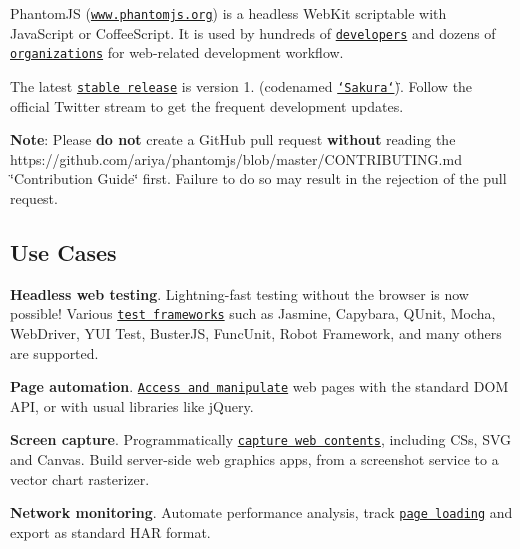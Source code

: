 Phantom\+J\+S (\href{http://phantomjs.org}{\tt www.\+phantomjs.\+org}) is a headless Web\+Kit scriptable with Java\+Script or Coffee\+Script. It is used by hundreds of \href{https://github.com/ariya/phantomjs/wiki/Buzz}{\tt developers} and dozens of \href{https://github.com/ariya/phantomjs/wiki/Users}{\tt organizations} for web-\/related development workflow.

The latest \href{http://phantomjs.org/release-1.9.html}{\tt stable release} is version 1. (codenamed \href{http://phantomjs.org/release-names.html}{\tt \char`\"{}\+Sakura\char`\"{}}). Follow the official Twitter stream \href{http://twitter.com/PhantomJS}{\tt } to get the frequent development updates.

{\bfseries Note}\+: Please {\bfseries do not} create a Git\+Hub pull request {\bfseries without} reading the https\+://github.com/ariya/phantomjs/blob/master/\+C\+O\+N\+T\+R\+I\+B\+U\+T\+I\+N\+G.\+md \char`\"{}\+Contribution Guide\char`\"{} first. Failure to do so may result in the rejection of the pull request.

\subsection*{Use Cases}


\begin{DoxyItemize}
\item {\bfseries Headless web testing}. Lightning-\/fast testing without the browser is now possible! Various \href{https://github.com/ariya/phantomjs/wiki/Headless-Testing}{\tt test frameworks} such as Jasmine, Capybara, Q\+Unit, Mocha, Web\+Driver, Y\+U\+I Test, Buster\+J\+S, Func\+Unit, Robot Framework, and many others are supported.
\item {\bfseries Page automation}. \href{https://github.com/ariya/phantomjs/wiki/Page-Automation}{\tt Access and manipulate} web pages with the standard D\+O\+M A\+P\+I, or with usual libraries like j\+Query.
\item {\bfseries Screen capture}. Programmatically \href{https://github.com/ariya/phantomjs/wiki/Screen-Capture}{\tt capture web contents}, including C\+Ss, S\+V\+G and Canvas. Build server-\/side web graphics apps, from a screenshot service to a vector chart rasterizer.
\item {\bfseries Network monitoring}. Automate performance analysis, track \href{https://github.com/ariya/phantomjs/wiki/Network-Monitoring}{\tt page loading} and export as standard H\+A\+R format.
\end{DoxyItemize}

